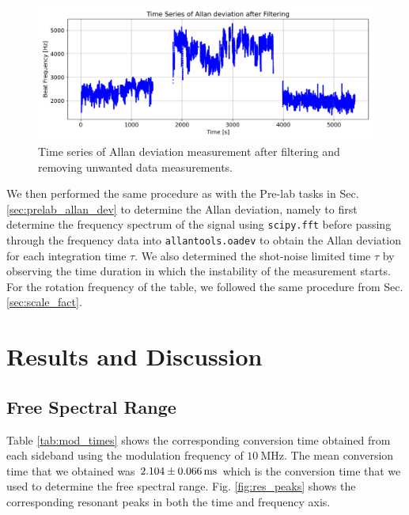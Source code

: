 \documentclass[a4paper]{report}
\numberwithin{equation}{section}
\begin{document}
\begin{figure}[h!]
	\centering
	\includegraphics[width=0.8\columnwidth]{allan_ts_filt.png}
	\caption{Time series of Allan deviation measurement after filtering and removing unwanted data measurements.}
	\label{fig:allan_ts_filt}
\end{figure}

We then performed the same procedure as with the Pre-lab tasks in Sec. \ref{sec:prelab_allan_dev} to determine the Allan deviation, namely to first determine the frequency spectrum of the signal using \texttt{scipy.fft} before passing through the frequency data into \texttt{allantools.oadev}
to obtain the Allan deviation for each integration time $\tau$. We also determined the shot-noise limited time $\tau$ by observing the time duration in which the instability of the 
measurement starts. For the rotation frequency of the table, we followed the same procedure from Sec. \ref{sec:scale_fact}. \par 



\chapter{Results and Discussion}

\section{Free Spectral Range} \label{sec:fsr}

Table \ref{tab:mod_times} shows the corresponding conversion time obtained from each sideband using the modulation frequency of $\SI{10}{\mega\hertz}$.
The mean conversion time that we obtained was $\SI{2.104 \pm 0.066}{\milli\second}$ which is the conversion time
that we used to determine the free spectral range. Fig. \ref{fig:res_peaks} shows the corresponding resonant peaks in both the time and frequency axis. \par
\end{document}
